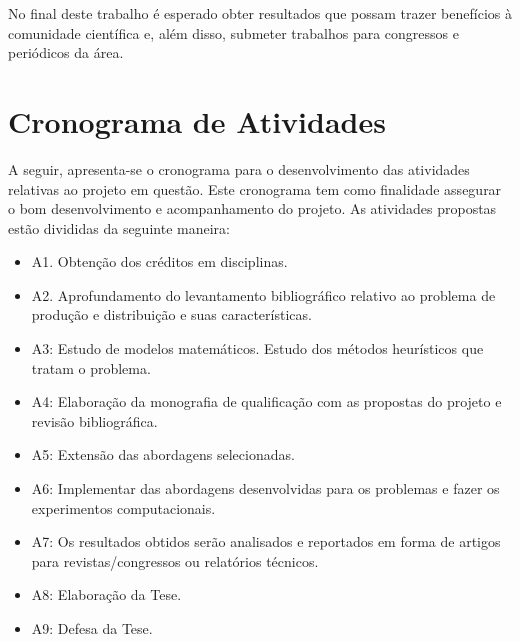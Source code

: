\documentclass[11pt]{article}
\begin{document}
No final deste trabalho é esperado obter resultados que possam trazer benefícios à comunidade científica e, além disso, submeter trabalhos para congressos e periódicos da área.

\section{Cronograma de Atividades}\label{sec:06}

A seguir, apresenta-se o cronograma para o desenvolvimento das atividades relativas ao projeto em questão. Este cronograma tem como finalidade assegurar o bom desenvolvimento e acompanhamento do projeto. As atividades propostas estão divididas da seguinte maneira:

\begin{itemize}
\item A1. Obtenção dos créditos em disciplinas. 
\item A2.	Aprofundamento do levantamento bibliográfico relativo ao problema de produção e distribuição e suas características.
\item A3:	Estudo de modelos matemáticos. Estudo dos métodos heurísticos que tratam o problema. 
\item A4: Elaboração da monografia de qualificação com as propostas do projeto e revisão bibliográfica. 
\item A5:	Extensão das abordagens selecionadas.
\item A6:	Implementar das abordagens desenvolvidas para os problemas e fazer os experimentos computacionais.  
\item A7:	Os resultados obtidos serão analisados e reportados em forma de artigos para revistas/congressos ou  relatórios técnicos. 
\item A8: Elaboração da Tese.
\item A9: Defesa da Tese.
\end{itemize}
\end{document}
